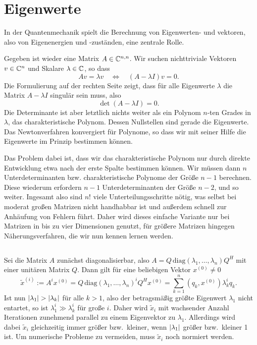 \section{Eigenwerte}

In der Quantenmechanik spielt die Berechnung von Eigenwerten- und
vektoren, also von Eigenenergien und -zuständen, eine zentrale Rolle.

Gegeben ist wieder eine Matrix $A\in\mathbb{C}^{n,n}$. Wir suchen
nichttriviale Vektoren $v\in\mathbb{C}^n$ und Skalare $\lambda\in\mathbb{C}$, so dass
\begin{equation}
  Av = \lambda v \quad\iff\quad (A-\lambda I)v = 0.
\end{equation}
Die Formulierung auf der rechten Seite zeigt, dass für alle Eigenwerte
$\lambda$ die Matrix $A-\lambda I$ singulär sein muss, also
\begin{equation}
  \det (A-\lambda I) = 0.
\end{equation}
Die Determinante ist aber letztlich nichts weiter als ein Polynom
$n$-ten Grades in $\lambda$, das charakteristische Polynom. Dessen Nullstellen sind gerade die Eigenwerte. Das Newtonverfahren konvergiert für Polynome, so dass wir mit
seiner Hilfe die Eigenwerte im Prinzip bestimmen können.

Das Problem dabei ist, dass wir das charakteristische Polynom nur durch direkte Entwicklung etwa nach der erste Spalte bestimmen können. Wir müssen dann $n$ Unterdeterminanten bzw. charakteristische Polynome der Größe $n-1$ berechnen. Diese wiederum erfordern
$n-1$ Unterdeterminanten der Größe $n-2$, und so weiter. Ingesamt also
sind $n!$ viele Unterteilungsschritte nötig, was selbst bei moderat
großen Matrizen nicht handhabbar ist und außerdem schnell zur
Anhäufung von Fehlern führt. Daher wird dieses einfache Variante nur
bei Matrizen in bis zu vier Dimensionen genutzt, für größere Matrizen
hingegen Näherungsverfahren, die wir nun kennen lernen werden.

\subsection{}

Sei die Matrix $A$ zunächst diagonalisierbar, also
$A=Q\,\text{diag}(\lambda_1,\ldots,\lambda_n)Q^H$ mit einer unitären Matrix
$Q$. Dann gilt für eine beliebigen Vektor $x^{(0)}\neq 0$
\begin{equation}
  \tilde{x}^{(i)} := A^i x^{(0)} = Q\,\text{diag}(\lambda_1,\ldots,\lambda_n)^i Q^H x^{(0)}
  = \sum_{k=1}^n (q_k, x^{(0)}) \lambda_k^i q_k.
\end{equation}
Ist nun $\left\lvert{\lambda_1}\right\rvert>\left\lvert{\lambda_k}\right\rvert$ für alle $k>1$, also der
betragsmäßig größte Eigenwert $\lambda_1$ nicht entartet, so ist
$\lambda_1^i\gg\lambda_k^i$ für große $i$. Daher wird $\tilde{x}_i$
mit wachsender Anzahl Iterationen zunehmend parallel zu einem
Eigenvektor zu $\lambda_1$. Allerdings wird dabei $\tilde{x}_i$
gleichzeitig immer größer bzw.\ kleiner, wenn $\left\lvert{\lambda_1}\right\rvert$ größer
bzw.\ kleiner 1 ist. Um numerische Probleme zu vermeiden, muss
$\tilde{x}_i$ noch normiert werden.

